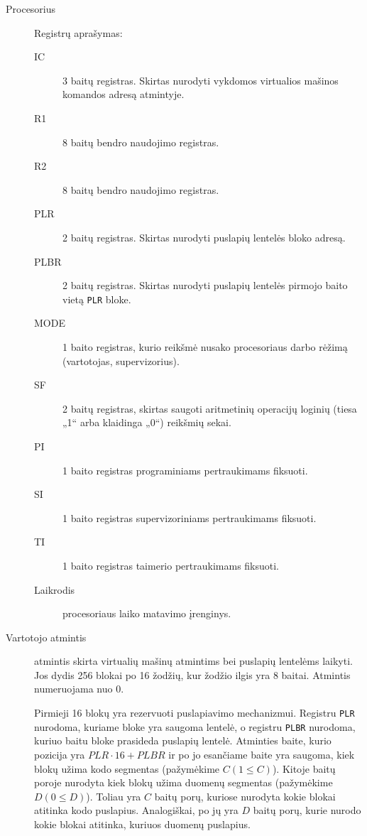 \begin{description}
  \item[Procesorius] Registrų aprašymas:
    \begin{description}
      \item[IC] 3 baitų registras. Skirtas nurodyti vykdomos virtualios
        mašinos komandos adresą atmintyje.
      \item[R1] 8 baitų bendro naudojimo registras.
      \item[R2] 8 baitų bendro naudojimo registras.
      \item[PLR] 2 baitų registras. Skirtas nurodyti puslapių lentelės 
        bloko adresą.
      \item[PLBR] 2 baitų registras. Skirtas nurodyti puslapių lentelės
        pirmojo baito vietą \verb|PLR| bloke.
      \item[MODE] 1 baito registras, kurio reikšmė nusako procesoriaus
        darbo rėžimą (vartotojas, supervizorius).
      \item[SF] 2 baitų registras, skirtas saugoti aritmetinių operacijų 
        loginių (tiesa „1“ arba klaidinga „0“) reikšmių sekai.
      \item[PI] 1 baito registras programiniams pertraukimams fiksuoti.
      \item[SI] 1 baito registras supervizoriniams pertraukimams fiksuoti.
      \item[TI] 1 baito registras taimerio pertraukimams fiksuoti.
      \item[Laikrodis] procesoriaus laiko matavimo įrenginys.
    \end{description}
  \item[Vartotojo atmintis] atmintis skirta virtualių mašinų atmintims bei 
    puslapių lentelėms laikyti. Jos dydis 256 blokai po 16 žodžių, kur
    žodžio ilgis yra 8 baitai. Atmintis numeruojama nuo 0. 

    Pirmieji 16 blokų yra rezervuoti puslapiavimo mechanizmui. Registru
    \verb|PLR| nurodoma, kuriame bloke yra saugoma lentelė, o registru
    \verb|PLBR| nurodoma, kuriuo baitu bloke prasideda puslapių lentelė.
    Atminties baite, kurio pozicija yra $PLR \cdot 16 + PLBR$ ir po jo 
    esančiame baite yra saugoma, kiek blokų užima kodo segmentas 
    (pažymėkime $C (1 \leq C)$). Kitoje baitų poroje nurodyta kiek blokų 
    užima duomenų segmentas (pažymėkime $D (0 \leq D)$). Toliau yra 
    $C$ baitų porų, kuriose nurodyta kokie blokai atitinka kodo puslapius.
    Analogiškai, po jų yra $D$ baitų porų, kurie nurodo kokie blokai 
    atitinka, kuriuos duomenų puslapius.


\end{description}
